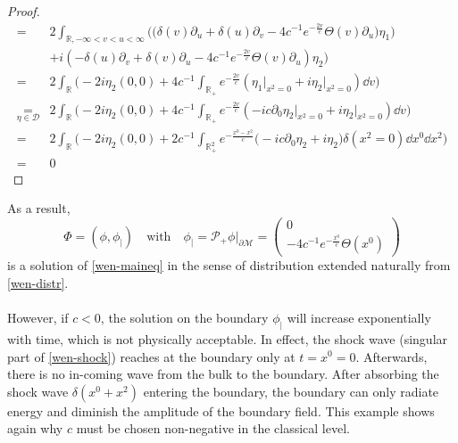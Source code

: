 \begin{proof}
\begin{equation*}
\begin{split}
%
= &2 \int_{\mathbb{R}, -\infty<v<u <\infty}\Big( \big(\delta(v) \partial_u + \delta(u)\partial_v -4c^{-1}e^{-\frac{2v}{c}}\Theta(v)\partial_u)\eta_1 \big)\\
&+ i (-\delta(u)\partial_v + \delta(v)\partial_u-4c^{-1}e^{-\frac{2v}{c}}\Theta(v)\partial_u)\eta_2
\Big)\\ 
%
=& 2\int_{\mathbb{R}}\Big( -2i\eta_2 (0,0) + 4c^{-1}\int_{\mathbb{R}_+}e^{-\frac{2v}{c} }(\eta_1\vert_{x^2 = 0} +i \eta_2\vert_{x^2 = 0}) \dd v\Big) \\ 
%
\underset{\eta\in \mathcal{D}} =& 2\int_{\mathbb{R}}\Big( -2i\eta_2 (0,0) + 4c^{-1}\int_{\mathbb{R}_+}e^{-\frac{2v}{c} }(-ic \partial_0\eta_2\vert_{x^2 = 0} +i\eta_2\vert_{x^2 = 0}) \dd v\Big) \\ 
% 
=& 2\int_{\mathbb{R}}\Big( -2i\eta_2 (0,0) + 2c^{-1}\int_{\mathbb{R}^2_+}e^{-\frac{x^0-x^2} {c} }\big(-ic \partial_0\eta_2 +i\eta_2\big)\delta(x^2 = 0) \dd x^0 \dd x^2\Big) \\ 
=& 0
\end{split}
\end{equation*}
\end{proof}
As a result, 
\begin{equation*}\Phi = (\phi, \phi_|) \quad \mathrm{with}\quad \phi_| = \mathcal{P}_+ \phi\vert_{\partial \mathcal{M}} = 
\begin{pmatrix} 0 \\ -4c^{-1}e^{- \frac{x^0}{c}} \Theta(x^0) \end{pmatrix}
\end{equation*}
 is a solution of \cref{wen-maineq} in the sense of distribution extended naturally from \cref{wen-distr}. \\\\
However, if $c<0$, the solution on the boundary $\phi_|$ will increase exponentially with time, which is not physically acceptable. 
In effect, the shock wave (singular part of \cref{wen-shock}) reaches at the boundary only at $t = x^0 = 0$.
Afterwards, there is no in-coming wave from the bulk to the boundary. 
After absorbing the shock wave $\delta(x^0+x^2)$ entering the boundary,
the boundary can only radiate energy and diminish the amplitude of the boundary field. 
This example shows again why $c$ must be chosen non-negative in the classical level.












